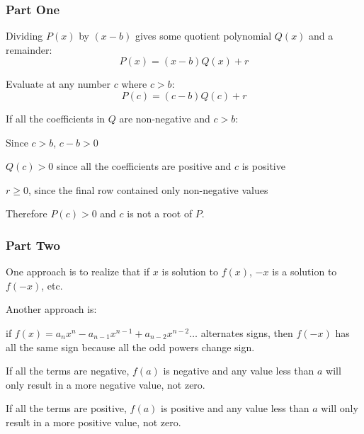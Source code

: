 \documentclass{exam}
\begin{document}
  \subsubsection{Part One}
  \begin{itemize*}
    \item Dividing $P(x)$ by $(x - b)$ gives some quotient polynomial $Q(x)$ and a remainder: 
      \[
        P(x) = (x - b)Q(x) + r
      \]

    \item Evaluate at any number $c$ where $c > b$:
      \[
        P(c) = (c - b)Q(c) + r
      \]

    \item If all the coefficients in $Q$ are non-negative and $c > b$:
      \begin{enumerate*}
        \item Since $c > b$, $c - b > 0$
        \item $Q(c) > 0$ since all the coefficients are positive and $c$ is positive
        \item $r \geq 0$, since the final row contained only non-negative values
      \end{enumerate*}

      Therefore $P(c) > 0$ and $c$ is not a root of $P$.

  \end{itemize*}

  \subsubsection{Part Two}

  One approach is to realize that if $x$ is solution to $f(x)$, $-x$ is a solution to $f(-x)$, etc.

  Another approach is:
  \begin{itemize*}
    \item if $f(x) = a_nx^n - a_{n-1}x^{n-1} + a_{n-2}x^{n-2} \ldots$ alternates signs, then $f(-x)$ has all the same sign
      because all the odd powers change sign.

    \item If all the terms are negative, $f(a)$ is negative and any value less than $a$ will only result in a more
      negative value, not zero.

    \item If all the terms are positive, $f(a)$ is positive and any value less than $a$ will only result in a more
      positive value, not zero.

%

  \end{itemize*}
\end{document}
